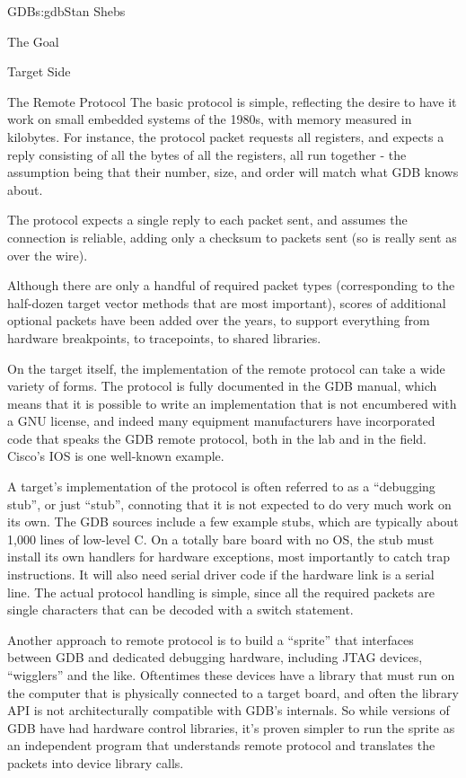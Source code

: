 \begin{aosachapter}{GDB}{s:gdb}{Stan Shebs}
\begin{aosasect1}{The Goal}
\begin{aosasect1}{Target Side}
\begin{aosasect2}{The Remote Protocol}
The basic protocol is simple, reflecting the desire to have it work on
small embedded systems of the 1980s, with memory measured in
kilobytes.  For instance, the protocol packet  requests all
registers, and expects a reply consisting of all the bytes of all the
registers, all run together - the assumption being that their number,
size, and order will match what GDB knows about.

The protocol expects a single reply to each packet sent, and assumes
the connection is reliable, adding only a checksum to packets sent
(so  is really sent as  over the wire).

Although there are only a handful of required packet types
(corresponding to the half-dozen target vector methods that are most
important), scores of additional optional packets have been added over
the years, to support everything from hardware breakpoints, to
tracepoints, to shared libraries.

On the target itself, the implementation of the remote protocol can
take a wide variety of forms.  The protocol is fully documented in the
GDB manual, which means that it is possible to write an implementation
that is not encumbered with a GNU license, and indeed many equipment
manufacturers have incorporated code that speaks the GDB remote
protocol, both in the lab and in the field.  Cisco's IOS is one
well-known example.

A target's implementation of the protocol is often referred to as a
``debugging stub'', or just ``stub'', connoting that it is not expected
to do very much work on its own.  The GDB sources include a few
example stubs, which are typically about 1,000 lines of low-level C.
On a totally bare board with no OS, the stub must install its own
handlers for hardware exceptions, most importantly to catch trap
instructions.  It will also need serial driver code if the hardware
link is a serial line.  The actual protocol handling is simple, since
all the required packets are single characters that can be decoded
with a switch statement.

Another approach to remote protocol is to build a ``sprite'' that
interfaces between GDB and dedicated debugging hardware, including
JTAG devices, ``wigglers'' and the like.  Oftentimes these devices
have a library that must run on the computer that is physically
connected to a target board, and often the library API is not
architecturally compatible with GDB's internals.  So while versions of
GDB have had hardware control libraries, it's proven simpler to run
the sprite as an independent program that understands remote protocol
and translates the packets into device library calls.


\end{aosasect2}
\end{aosasect1}
\end{aosasect1}
\end{aosachapter}
